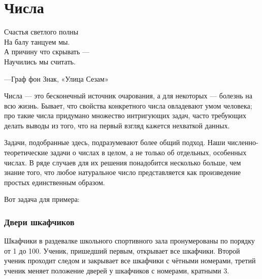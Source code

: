 \chapter*{Числа}

\setlength{\epigraphwidth}{.4\textwidth}
\epigraph{Счастья светлого полны\\ %
На балу танцуем мы.\\ %
А причину что скрывать ---\\ %
Научились мы считать.}{---Граф фон Знак, «Улица Сезам»}


 

Числа --- это бесконечный источник очарования, а для некоторых --- болезнь на всю жизнь. %
Бывает, что свойства конкретного числа овладевают умом человека;
про такие числа придумано множество интригующих задач,
часто требующих делать выводы из того, что на первый взгляд кажется нехваткой данных.

Задачи, подобранные здесь, подразумевают %
более общий подход. %
Наши численно-теоретические задачи о числах в целом, а не только об отдельных, особенных числах.
В ряде случаев для их решения понадобится несколько больше, чем знание того, 
что любое натуральное число представляется как произведение простых единственным образом.

\medskip

Вот задача для примера:

\subsection*{Двери шкафчиков}%

Шкафчики в раздевалке школьного спортивного зала пронумерованы по порядку от 1 до 100.
Ученик, пришедший первым, открывает все шкафчики.
Второй ученик проходит следом и закрывает все шкафчики с чётными номерами, третий ученик меняет положение дверей у шкафчиков с номерами, кратными 3.

